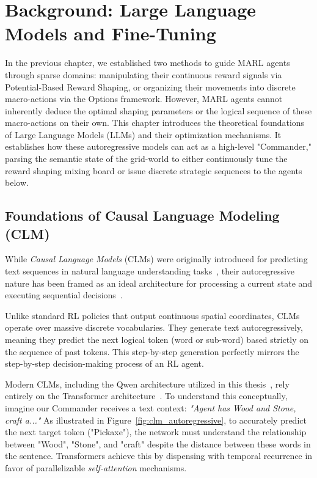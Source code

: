 \section{Background: Large Language Models and Fine-Tuning}
\label{ch:background_llm}

In the previous chapter, we established two methods to guide MARL agents through sparse domains: manipulating their continuous reward signals via Potential-Based Reward Shaping, or organizing their movements into discrete macro-actions via the Options framework. However, MARL agents cannot inherently deduce the optimal shaping parameters or the logical sequence of these macro-actions on their own. This chapter introduces the theoretical foundations of Large Language Models (LLMs) and their optimization mechanisms. It establishes how these autoregressive models can act as a high-level "Commander," parsing the semantic state of the grid-world to either continuously tune the reward shaping mixing board or issue discrete strategic sequences to the agents below.

\subsection{Foundations of Causal Language Modeling (CLM)}
\label{sec:llm_foundations}

While \emph{Causal Language Models} (CLMs) were originally introduced for predicting text sequences in natural language understanding tasks~\parencite{Radford_Narasimhan_Salimans_Sutskever_2018}, their autoregressive nature has been framed as an ideal architecture for processing a current state and executing sequential decisions~\parencite{Chen_Lu_Rajeswaran_Lee_Grover_Laskin_Abbeel_Srinivas_Mordatch_2021}. 

Unlike standard RL policies that output continuous spatial coordinates, CLMs operate over massive discrete vocabularies. They generate text autoregressively, meaning they predict the next logical token (word or sub-word) based strictly on the sequence of past tokens. This step-by-step generation perfectly mirrors the step-by-step decision-making process of an RL agent. 

Modern CLMs, including the Qwen architecture utilized in this thesis~\parencite{Yang_Li_Yang_Zhang_Hui_Zheng_Yu_Gao_Huang_Lv_et_al._2025}, rely entirely on the Transformer architecture~\parencite{Vaswani_Shazeer_Parmar_Uszkoreit_Jones_Gomez_Kaiser_Polosukhin_2017}. To understand this conceptually, imagine our Commander receives a text context: \emph{"Agent has Wood and Stone, craft a..."} As illustrated in Figure~\ref{fig:clm_autoregressive}, to accurately predict the next target token ("Pickaxe"), the network must understand the relationship between "Wood", "Stone", and "craft" despite the distance between these words in the sentence. Transformers achieve this by dispensing with temporal recurrence in favor of parallelizable \emph{self-attention} mechanisms. 

